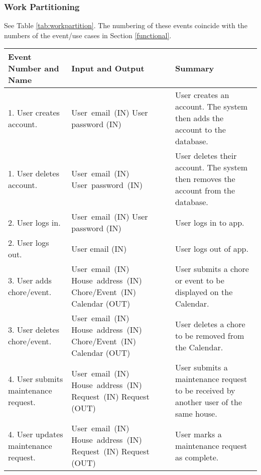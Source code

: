 \documentclass[12pt]{article}
\begin{document}
\subsubsection{Work Partitioning} 
See Table \ref{tab:workpartition}. The numbering of these events coincide with the numbers of the event/use cases in Section \ref{functional}.
\begin{longtable}{|p{5cm}|p{5cm}|p{5cm}|}
\hline
\textbf{Event Number and Name}  & \textbf{Input and Output} & \textbf{Summary} \\ 
\hline
1. User creates account. & \mbox{User email (IN)} \linebreak User password (IN) & User creates 
an account. The system then adds the account to the database. \\ 
\hline
1. User deletes account. & \mbox{User email (IN)} \linebreak \mbox{User password 
(IN)} & User deletes their account. The system then removes the account from the 
database. \\ 
\hline
2. User logs in. & \mbox{User email (IN)} \linebreak User password (IN) & User logs 
in to app. \\ 
\hline
2. User logs out. & User email (IN) & User logs out of app. \\
\hline
3. User adds chore/event. & \mbox{User email (IN)} \linebreak \mbox{House address (IN)} \linebreak\mbox{Chore/Event (IN)} 
\linebreak Calendar (OUT) & User submits a chore or event to be displayed 
on the Calendar. \\ \hline
3. User deletes chore/event. & \mbox{User email (IN)} \linebreak \mbox{House address (IN)} \linebreak\mbox{Chore/Event (IN)} 
\linebreak Calendar (OUT) & User deletes a chore to be removed from the Calendar. \\
\hline
4. User submits maintenance request. & \mbox{User email (IN)} \linebreak \mbox{House address (IN)} \linebreak \mbox{Request (IN)} \linebreak Request (OUT) & User submits a 
maintenance request to be received by another user of the same house. \\
\hline
4. User updates maintenance request. & \mbox{User email (IN)} \linebreak \mbox{House address (IN)} \linebreak \mbox{Request (IN)} \linebreak Request (OUT) & User marks a maintenance request as complete. \\

\end{longtable}
\end{document}
